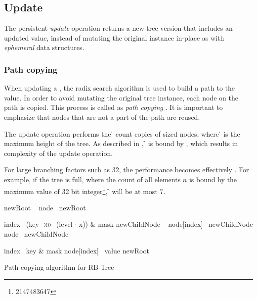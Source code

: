 \subsection{Update}
The persistent \emph{update} operation returns a new tree version that includes an updated value, instead of mutating the original instance in-place as with \emph{ephemeral} data structures.

\subsubsection*{Path copying}
When updating a \treerb{}, the radix search algorithm is used to build a path to the value. In order to avoid mutating the original tree instance, each node on the path is copied. This process is called as \emph{path copying} \cite{planar-point-location}. It is important to emphasize that nodes that are not a part of the path are reused.

The update operation performs the \h{} count copies of \m{} sized nodes, where \h{} is the maximum height of the tree. As described in , \h{} is bound by , which results in {} complexity of the update operation.

For large branching factors \m{} such as 32, the performance becomes effectively . For example, if the tree is full, where the count of all elements $n$ is bound by the maximum value of 32 bit integer\footnote{2147483647}, \h{} will be at most 7.

\begin{listing}[ht!]
    \begin{algorithmic}[1]
            \State newRoot \la\ 
            \State node \la\ newRoot

                \State index \la\ (key $\ggg$ (level $\cdot$ x)) \& mask
                \State newChildNode \la\ 
                \State node[index] \la\ newChildNode
                \State node \la\ newChildNode
            \EndFor

            \State index \la\ key \& mask
            \State node[index] \la\ value
            \State \Return newRoot
        \EndFunction
    \end{algorithmic}

    \caption{Path copying algorithm for RB-Tree}
    \label{lst:rb-tree-update}
\end{listing}

